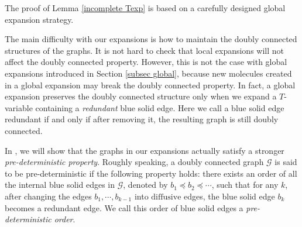 \documentclass{article}
\newcommand{\1}{\mathds{1}}
\numberwithin{equation}{section}
\newcommand{\be}{\begin{equation}}
\newcommand{\ee}{\end{equation}}
\newcommand{\fa}{{\mathfrak a}}
\newcommand{\fb}{{\mathfrak b}}
\renewcommand{\cal}{\mathcal}
\newcommand{\wt}{\widetilde}
\renewcommand{\leq}{\leqslant}
\renewcommand{\le}{\leq}
\newcommand{\E}{\mathbb{E}}
\newcommand{\dashed}{\text{diffusive}}
\theoremstyle{plain} %
\theoremstyle{remark}
\newcommand{\AT}{\mathcal A_T}
\begin{document}

\medskip

 The proof of Lemma \ref{incomplete Texp} is based on a carefully designed global expansion strategy. %

The main difficulty with our expansions is how to maintain the doubly connected structures of the graphs. It is not hard to check that local expansions will not affect the  doubly connected property. However, this is not the case with global expansions introduced in Section \ref{subsec global}, because new molecules created in a global expansion may break the doubly connected property. In fact, a global expansion preserves the  doubly connected structure only when we expand a $T$-variable containing a \emph{redundant} blue solid edge. Here we call a blue solid edge redundant if and only if after removing it, the resulting graph is still doubly connected. 

In \cite{PartII_high}, we will show that the graphs in our expansions actually satisfy a stronger \emph{pre-deterministic property}. Roughly speaking, a doubly connected graph $\cal G$ is said to be pre-deterministic if the following property holds: there exists an order of all the internal blue solid edges %
in $\cal G$, denoted by $b_1\preceq b_2\preceq \cdots$, such that for any $k$, after changing the edges $b_1, \cdots, b_{k-1} $ into $\dashed$ edges, the blue solid edge $b_k$ becomes a redundant edge. We call this order of blue solid edges a \emph{pre-deterministic order}. 
\end{document}
